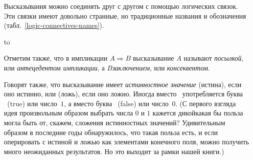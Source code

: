 Высказывания можно соединять друг с другом с помощью 
логических связок.%
%
Эти связки имеют довольно странные, но
традиционные названия и обозначения
(табл.~\ref{logic-connectives-names}).
\begin{table}[ht]
\hbox to 
\caption{Логические связки, обозначения и названия.%
}
\label{logic-connectives-names}
\end{table}
Отметим также, что в импликации $A\Rightarrow B$ высказывание
$A$ называют \emph{посылкой},%
или \emph{антецедентом импликации},%
а $B$\т \emph{заключением},%
или \emph{консеквентом}.%

Говорят также, что высказывание имеет \emph{истинностное значение}%
%
{\И} (истина),%
если оно истинно, или {\Л} (ложь),%
если оно ложно.
Иногда вместо \И\ употребляется буква \T\ (true) или число~$1$,%
а вместо \Л\т буква \F\ (false) или число~$0$.
(С первого взгляда идея произвольным образом выбрать числа $0$ и
$1$ кажется дикой\т какая бы польза могла быть от, скажем,
сложения истинностных значений? Удивительным образом в последние
годы обнаружилось, что такая польза есть, и если оперировать с
истиной и ложью как элементами конечного поля, можно получить
много неожиданных результатов. Но это выходит за рамки нашей
книги.)

